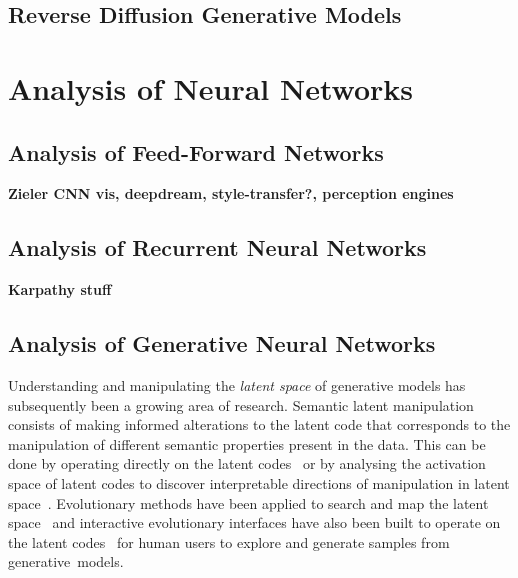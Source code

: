 
\subsection{Reverse Diffusion Generative Models}

\section{Analysis of Neural Networks} 

\subsection{Analysis of Feed-Forward Networks}

\textbf{Zieler CNN vis, deepdream, style-transfer?, perception engines}

\subsection{Analysis of Recurrent Neural Networks}

\textbf{Karpathy stuff}

\subsection{Analysis of Generative Neural Networks}

Understanding and manipulating the \emph{latent space} of generative models has subsequently been a growing area of research. 
Semantic latent manipulation consists of making informed alterations to the latent code that corresponds to the manipulation of different semantic properties present in the data. 
This can be done by operating directly on the latent codes~\citep{brock2016neural, shen2020interpreting} or by analysing the activation space of latent codes to discover interpretable directions of manipulation in latent space~\citep{harkonen2020ganspace}. 
Evolutionary methods have been applied to search and map the latent space~\citep{bontrager2018deepmasterprints, fernandes2020evolutionary} and interactive evolutionary interfaces have also been built to operate on the latent codes~\citep{Simon-ganbreeder} for human users to explore and generate samples from generative~models. 

